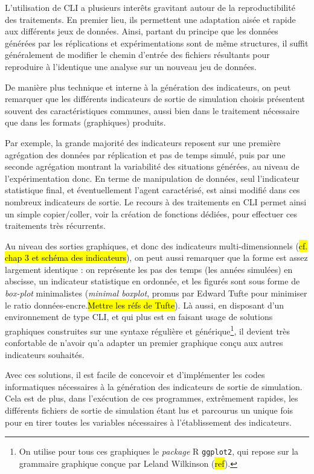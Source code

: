 	L'utilisation de CLI a plusieurs interêts gravitant autour de la reproductibilité des traitements.
	En premier lieu, ils permettent une adaptation aisée et rapide aux différents jeux de données.
	Ainsi, partant du principe que les données générées par les réplications et expérimentations sont de même structures, il suffit généralement de modifier le chemin d'entrée des fichiers résultants pour reproduire à l'identique une analyse sur un nouveau jeu de données.

	De manière plus technique et interne à la génération des indicateurs, on peut remarquer que les différents indicateurs de sortie de simulation choisis présentent souvent des caractéristiques communes, aussi bien dans le traitement nécessaire que dans les formats (graphiques) produits.

	Par exemple, la grande majorité des indicateurs reposent sur une première agrégation des données par réplication et pas de temps simulé, puis par une seconde agrégation montrant la variabilité des situations générées, au niveau de l'expérimentation donc.
	En terme de manipulation de données, seul l'indicateur statistique final, et éventuellement l'agent caractérisé, est ainsi modifié dans ces nombreux indicateurs de sortie.
	Le recours à des traitements en CLI permet ainsi un simple copier/coller, voir la création de fonctions dédiées, pour effectuer ces traitements très récurrents.

	Au niveau des sorties graphiques, et donc des indicateurs multi-dimensionnels (\hl{cf. chap 3 et schéma des indicateurs}), on peut aussi remarquer que la forme est assez largement identique : on représente les pas des temps (les années simulées) en abscisse, un indicateur statistique en ordonnée, et les figurés sont sous forme de \textit{box-plot} minimalistes (\og \textit{minimal boxplot}\fg{}, promus par Edward Tufte pour minimiser le ratio données-encre.\hl{Mettre les réfs de Tufte}).
	Là aussi, en disposant d'un environnement de type CLI, et qui plus est en faisant usage de solutions graphiques construites sur une syntaxe régulière et générique\footnote{
	On utilise pour tous ces graphiques le \textit{package} R \texttt{ggplot2}, qui repose sur la grammaire graphique conçue par Leland Wilkinson (\hl{ref}).
	}, il devient très confortable de n'avoir qu'a adapter un premier graphique conçu aux autres indicateurs souhaités.

	Avec ces solutions, il est facile de concevoir et d'implémenter les codes informatiques nécessaires à la génération des indicateurs de sortie de simulation.
	Cela est de plus, dans l'exécution de ces programmes, extrêmement rapides, les différents fichiers de sortie de simulation étant lus et parcourus un unique fois pour en tirer toutes les variables nécessaires à l'établissement des indicateurs.

